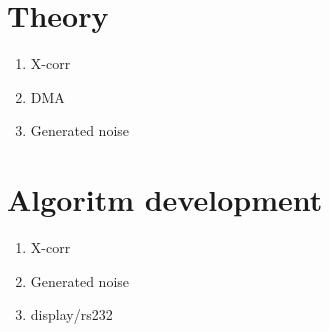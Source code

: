 \chapter{Theory}
\begin{enumerate}
\item X-corr
\item DMA
\item Generated noise
\end{enumerate}

\chapter{Algoritm development}
\begin{enumerate}
\item X-corr
\item Generated noise
\item display/rs232
\end{enumerate}

